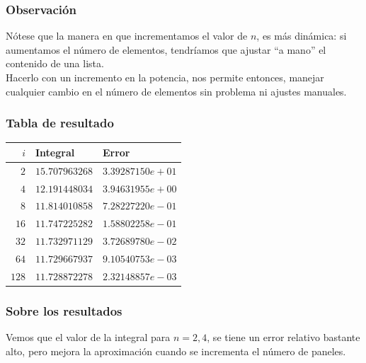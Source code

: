 \begin{frame}
\frametitle{Observación}
Nótese que la manera en que incrementamos el valor de $n$, es más dinámica: si aumentamos el número de elementos, tendríamos que ajustar \enquote{a mano} el contenido de una lista.
\\
\bigskip
Hacerlo con un incremento en la potencia, nos permite entonces, manejar cualquier cambio en el número de elementos sin problema ni ajustes manuales.
\end{frame}
\begin{frame}
\frametitle{Tabla de resultado}
\fontsize{12}{12}\selectfont
\begin{center}
\begin{tabular}{r | l | l} 
$i$ & Integral & Error \\ \hline
$2$ & $15.707963268$ & $3.39287150e+01$ \\ \hline
$4$ & $12.191448034$ & $3.94631955e+00$ \\ \hline
$8$ & $11.814010858$ & $7.28227220e-01$ \\ \hline
$16$ & $11.747225282$ & $1.58802258e-01$ \\ \hline
$32 $ & $11.732971129$ & $3.72689780e-02$ \\ \hline
$64 $ & $11.729667937$ & $9.10540753e-03$ \\ \hline
$128$ & $11.728872278$ & $2.32148857e-03$
\end{tabular}
\end{center}
\end{frame}
\begin{frame}
\frametitle{Sobre los resultados}
Vemos que el valor de la integral para $n=2, 4$, se tiene un error relativo bastante alto, pero mejora la aproximación cuando se incrementa el número de paneles.
\end{frame}

